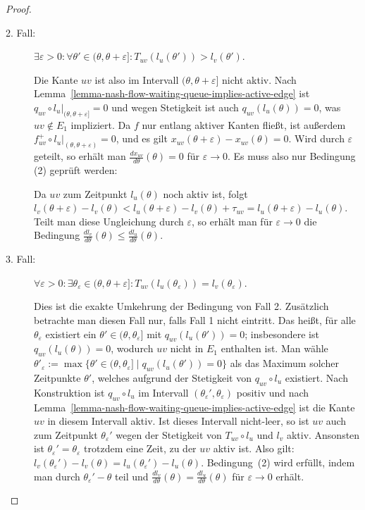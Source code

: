\begin{proof}
\begin{description}
		
		\item[2. Fall:] $\exists \varepsilon > 0: \forall \theta'\in(\theta, \theta + \varepsilon]: T_{uv}(l_u(\theta'))>l_v(\theta')$.
		
		Die Kante ${uv}$ ist also im Intervall $(\theta, \theta + \varepsilon]$ nicht aktiv.
		Nach Lemma~\ref{lemma-nash-flow-waiting-queue-implies-active-edge} ist $q_{uv} \circ l_u\big|_{(\theta, \theta+\varepsilon]}=0$ und wegen Stetigkeit ist auch $q_{uv}(l_u(\theta))=0$, was $uv\notin E_1$ impliziert.
		Da $f$ nur entlang aktiver Kanten fließt, ist außerdem $f_{uv}^+ \circ l_u \big|_{(\theta, \theta+\varepsilon)} = 0$, und es gilt $x_{uv}(\theta + \varepsilon) - x_{uv}(\theta)=0$.
		Wird durch $\varepsilon$ geteilt, so erhält man $\frac{dx_{uv}}{d\theta}(\theta) = 0$ für $\varepsilon\rightarrow0$.
		Es muss also nur Bedingung (2) geprüft werden:
		
		
		Da $uv$ zum Zeitpunkt $l_u(\theta)$ noch aktiv ist, folgt $l_v(\theta + \varepsilon) - l_v(\theta) < l_u(\theta+\varepsilon) - l_v(\theta) + \tau_{uv} = l_u(\theta + \varepsilon) - l_u(\theta)$.
		Teilt man diese Ungleichung  durch $\varepsilon$, so erhält man für $\varepsilon\rightarrow 0$ die Bedingung $\frac{dl_v}{d\theta}(\theta)\leq\frac{dl_u}{d\theta}(\theta)$.
		
		\item[3. Fall:] $\forall \varepsilon>0: \exists \theta_{\varepsilon}\in (\theta, \theta+\varepsilon]: T_{uv}(l_u(\theta_\varepsilon)) = l_v(\theta_\varepsilon)$.
		
		Dies ist die exakte Umkehrung der Bedingung von Fall 2.
		Zusätzlich betrachte man diesen Fall nur, falls Fall 1 nicht eintritt.
		Das heißt, für alle $\theta_\varepsilon$ existiert ein $\theta'\in(\theta, \theta_\varepsilon]$ mit $q_{uv}(l_u(\theta')) = 0$; insbesondere ist $q_{uv}(l_u(\theta))= 0$, wodurch $uv$ nicht in $E_1$ enthalten ist.
		Man wähle $\theta'_\varepsilon:=\max\{ \theta'\in (\theta, \theta_\varepsilon] \mid q_{uv}(l_u(\theta')) = 0 \}$ als das Maximum solcher Zeitpunkte $\theta'$, welches aufgrund der Stetigkeit von $q_{uv}\circ l_u$ existiert.
		Nach Konstruktion ist $q_{uv}\circ l_u$ im Intervall $(\theta_\varepsilon', \theta_\varepsilon)$ positiv und nach Lemma~\ref{lemma-nash-flow-waiting-queue-implies-active-edge} ist die Kante $uv$ in diesem Intervall aktiv.
		Ist dieses Intervall nicht-leer, so ist $uv$ auch zum Zeitpunkt $\theta_\varepsilon'$ wegen der Stetigkeit von $T_{uv}\circ l_u$ und $l_v$ aktiv. Ansonsten ist $\theta_\varepsilon'=\theta_\varepsilon$ trotzdem eine Zeit, zu der $uv$ aktiv ist. Also gilt: $l_v(\theta_\varepsilon') - l_v(\theta) = l_u(\theta_\varepsilon') - l_u(\theta)$.
		Bedingung~(2) wird erfüllt, indem man durch $\theta_\varepsilon'-\theta$ teil und $\frac{dl_v}{d\theta}(\theta) = \frac{dl_u}{d\theta}(\theta)$ für $\varepsilon\rightarrow0$ erhält.
		

\end{description}
\end{proof}
